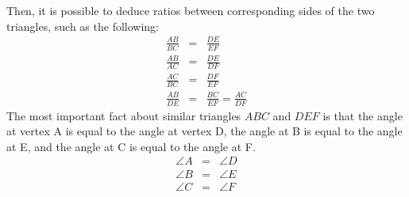 \documentclass[10pt,a4paper,titlepage,twoside,openright]{report}
\begin{document}
Then, it is possible to deduce ratios between corresponding sides of the two triangles, such as the following:
\begin{eqnarray*}
\frac{AB}{BC} &=& \frac{DE}{EF}\\
\frac{AB}{AC} &=& \frac{DE}{DF}\\
\frac{AC}{BC} &=& \frac{DF}{EF}\\
\frac{AB}{DE} &=& \frac{BC}{EF} = \frac{AC}{DF}
\end{eqnarray*}
The most important fact about similar triangles $ABC$ and $DEF$ is that the angle at vertex A is equal to the angle at vertex D, the angle at B is equal to the angle at E, and the angle at C is equal to the angle at F.
\begin{eqnarray*}
\angle A &=& \angle D\\
\angle B &=& \angle E\\
\angle C &=& \angle F\\
\end{eqnarray*}
\end{document}
